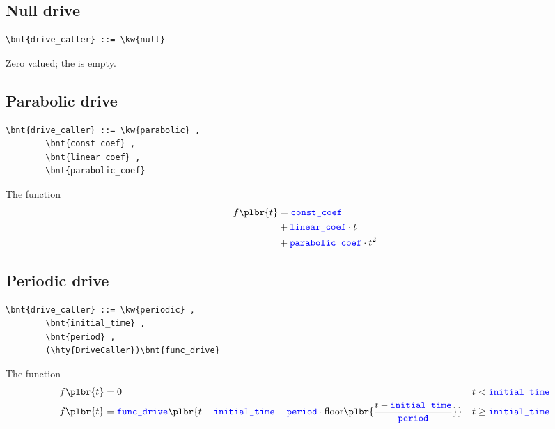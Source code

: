 \subsection{Null drive}
\begin{Verbatim}[commandchars=\\\{\}]
    \bnt{drive_caller} ::= \kw{null}
\end{Verbatim}
Zero valued; the  is empty.

\subsection{Parabolic drive}
\begin{Verbatim}[commandchars=\\\{\}]
    \bnt{drive_caller} ::= \kw{parabolic} ,
        \bnt{const_coef} , 
        \bnt{linear_coef} , 
        \bnt{parabolic_coef}
\end{Verbatim}
The function
\begin{align}
	f\plbr{t} &= \nt{const\_coef} \nonumber \\
		&+ \nt{linear\_coef} \cdot t \nonumber \\
		&+ \nt{parabolic\_coef} \cdot t^2
\end{align}

\subsection{Periodic drive}
\begin{Verbatim}[commandchars=\\\{\}]
    \bnt{drive_caller} ::= \kw{periodic} ,
        \bnt{initial_time} ,
        \bnt{period} ,
        (\hty{DriveCaller})\bnt{func_drive}
\end{Verbatim}
The function
\begin{align}
	f\plbr{t}
	&=
	0
	& t < \nt{initial\_time}
	\nonumber \\
	f\plbr{t}
	&=
	\nt{func\_drive}\plbr{
		t
		-
		\nt{initial\_time}
		-
		\nt{period} \cdot \textrm{floor}\plbr{\frac{t - \nt{initial\_time}}{\nt{period}}}
	}
	&
	t \ge \nt{initial\_time}
\end{align}

